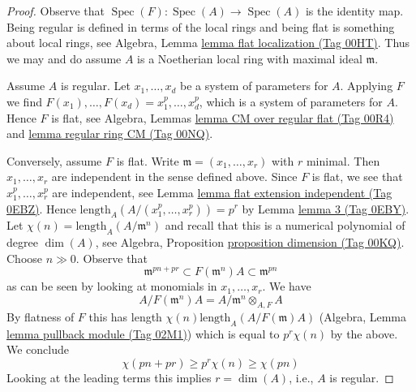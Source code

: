 \documentclass{amsart}
\theoremstyle{plain}
\theoremstyle{definition}
\theoremstyle{remark}
\numberwithin{equation}{subsection}
\def\Spec{\mathop{\mathrm{Spec}}}
\begin{document}
\begin{proof}
Observe that $\Spec(F) : \Spec(A) \to \Spec(A)$ is the identity map.
Being regular is defined in terms of the local rings and being flat
is something about local rings, see
Algebra, Lemma \href{https://stacks.math.columbia.edu/tag/00HT}{lemma flat localization (Tag 00HT)}.
Thus we may and do assume $A$ is a Noetherian
local ring with maximal ideal $\mathfrak m$.

\medskip\noindent
Assume $A$ is regular. Let $x_1, \ldots, x_d$ be a
system of parameters for $A$. Applying $F$ we find
$F(x_1), \ldots, F(x_d) = x_1^p, \ldots, x_d^p$,
which is a system of parameters for $A$. Hence $F$ is flat, see
Algebra, Lemmas \href{https://stacks.math.columbia.edu/tag/00R4}{lemma CM over regular flat (Tag 00R4)} and
\href{https://stacks.math.columbia.edu/tag/00NQ}{lemma regular ring CM (Tag 00NQ)}.

\medskip\noindent
Conversely, assume $F$ is flat. Write $\mathfrak m = (x_1, \ldots, x_r)$
with $r$ minimal. Then $x_1, \ldots, x_r$ are independent in the sense
defined above. Since $F$ is flat, we see that $x_1^p, \ldots, x_r^p$
are independent, see Lemma \href{https://stacks.math.columbia.edu/tag/0EBZ}{lemma flat extension independent (Tag 0EBZ)}.
Hence $\text{length}_A(A/(x_1^p, \ldots, x_r^p)) = p^r$ by
Lemma \href{https://stacks.math.columbia.edu/tag/0EBY}{lemma 3 (Tag 0EBY)}.
Let $\chi(n) = \text{length}_A(A/\mathfrak m^n)$ and recall
that this is a numerical polynomial of degree $\dim(A)$, see
Algebra, Proposition \href{https://stacks.math.columbia.edu/tag/00KQ}{proposition dimension (Tag 00KQ)}.
Choose $n \gg 0$. Observe that
$$
\mathfrak m^{pn + pr} \subset F(\mathfrak m^n)A \subset \mathfrak m^{pn}
$$
as can be seen by looking at monomials in $x_1, \ldots, x_r$. We have
$$
A/F(\mathfrak m^n)A = A/\mathfrak m^n \otimes_{A, F} A
$$
By flatness of $F$ this has length $\chi(n) \text{length}_A(A/F(\mathfrak m)A)$
(Algebra, Lemma \href{https://stacks.math.columbia.edu/tag/02M1}{lemma pullback module (Tag 02M1)})
which is equal to $p^r\chi(n)$ by the above. We conclude
$$
\chi(pn + pr) \geq p^r\chi(n) \geq \chi(pn)
$$
Looking at the leading terms this implies $r = \dim(A)$, i.e., $A$ is regular.
\end{proof}
\end{document}
